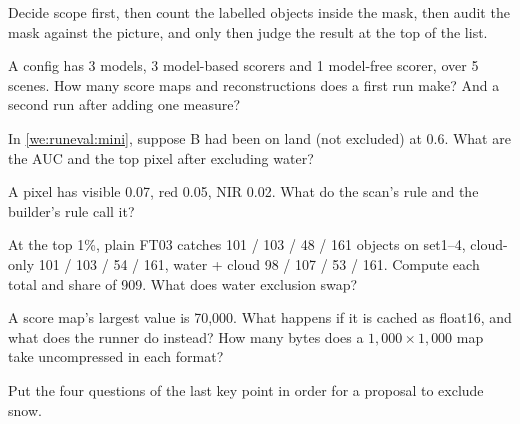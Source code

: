 \begin{keypoint}
Decide scope first, then count the labelled objects inside the mask, then audit the mask against the picture, and only
then judge the result at the top of the list.
\end{keypoint}

\begin{confusions}
\end{confusions}

\begin{checkyourself}
\item\label{ex:runeval:1} A config has 3 models, 3 model-based scorers and 1 model-free scorer, over 5 scenes. How many
score maps and reconstructions does a first run make? And a second run after adding one measure?
\item\label{ex:runeval:2} In \cref{we:runeval:mini}, suppose B had been on land (not excluded) at 0.6. What are the AUC
and the top pixel after excluding water?
\item\label{ex:runeval:3} A pixel has visible 0.07, red 0.05, NIR 0.02. What do the scan's rule and the builder's rule
call it?
\item\label{ex:runeval:4} At the top 1\%, plain FT03 catches 101 / 103 / 48 / 161 objects on set1--4, cloud-only 101 /
103 / 54 / 161, water + cloud 98 / 107 / 53 / 161. Compute each total and share of 909. What does water exclusion swap?
\item\label{ex:runeval:5} A score map's largest value is 70,000. What happens if it is cached as float16, and what does
the runner do instead? How many bytes does a $1{,}000 \times 1{,}000$ map take uncompressed in each format?
\item\label{ex:runeval:6} Put the four questions of the last key point in order for a proposal to exclude snow.
\end{checkyourself}

